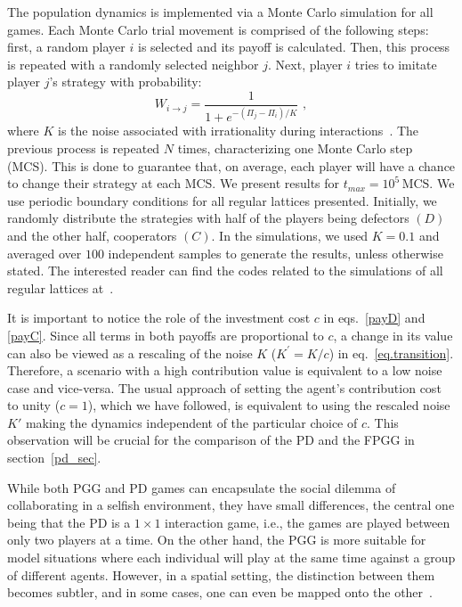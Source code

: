 \documentclass[5p,review]{elsarticle}
\begin{document}
The population dynamics is implemented via a Monte Carlo simulation for all games. Each Monte Carlo trial movement is comprised of the following steps: first, a random player $i$ is selected and its payoff is calculated. Then, this process is repeated with a randomly selected neighbor $j$. Next, player $i$ tries to imitate player $j$'s strategy with probability:
\begin{equation} \label{eq.transition}
     W_{i\rightarrow j}= \frac{1}{1+e^{-(\Pi_j-\Pi_i)/K}} \,\,,   
\end{equation}
where $ K $ is the noise associated with irrationality during interactions~\cite{Szabo2007, szolnoki_pre09c}.
%
The previous process is repeated $N$ times, characterizing one Monte Carlo step (MCS). This is done to guarantee that, on average, each player will have a chance to change their strategy at each MCS. We present results for $t_{max} = 10 ^ 5\, \text{MCS} $.
%
We use periodic boundary conditions for all regular lattices presented. Initially, we randomly distribute the strategies with half of the players being defectors $( D )$ and the other half, cooperators $(C)$.
%
In the simulations, we used $K=0.1$ and averaged over $100$ independent samples to generate the results, unless otherwise stated. The interested reader can find the codes related to the simulations of all regular lattices at~\cite{github}.

It is important to notice the role of the investment cost $c$ in eqs.~\ref{payD} and \ref{payC}.
%
Since all terms in both payoffs are proportional to $c$, a change in its value can also be viewed as a rescaling of the noise $K$ ($K^\prime = K/c$) in eq.~\ref{eq.transition}.
%
Therefore, a scenario with a high contribution value is equivalent to a low noise case and vice-versa. 
%
The usual approach of setting the agent's contribution cost to unity ($c=1$), which we have followed, is equivalent to using the rescaled noise $K'$ making the dynamics independent of the particular choice of $c$. This observation will be crucial for the comparison of the PD and the FPGG in section~\ref{pd_sec}.

While both PGG and PD games can encapsulate the social dilemma of collaborating in a selfish environment, they have small differences, the central one being that the PD is a $1\times 1$ interaction game, i.e., the games are played between only two players at a time. On the other hand, the PGG is more suitable for model situations where each individual will play at the same time against a group of different agents. However, in a spatial setting, the distinction between them becomes subtler, and in some cases, one can even be mapped onto the other~\cite{Hauert2003}. 
\end{document}
